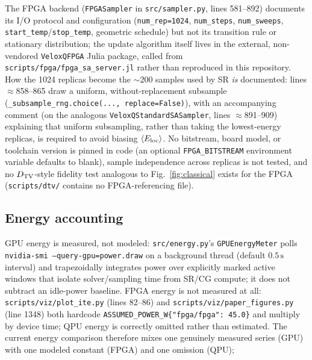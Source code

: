 The FPGA backend (\texttt{FPGASampler} in \texttt{src/sampler.py}, lines 581--892) documents its I/O protocol and configuration (\texttt{num\_rep=1024}, \texttt{num\_steps}, \texttt{num\_sweeps}, \texttt{start\_temp}/\texttt{stop\_temp}, geometric schedule) but not its transition rule or stationary distribution; the update algorithm itself lives in the external, non-vendored \texttt{VeloxQFPGA} Julia package, called from \texttt{scripts/fpga/fpga\_sa\_server.jl} rather than reproduced in this repository. How the 1024 replicas become the $\sim\!200$ samples used by SR \emph{is} documented: lines $\approx$858--865 draw a uniform, without-replacement subsample (\texttt{\_subsample\_rng.choice(..., replace=False)}), with an accompanying comment (on the analogous \texttt{VeloxQStandardSASampler}, lines $\approx$891--909) explaining that uniform subsampling, rather than taking the lowest-energy replicas, is required to avoid biasing $\left\langle E_{\mathrm{loc}}\right\rangle$. No bitstream, board model, or toolchain version is pinned in code (an optional \texttt{FPGA\_BITSTREAM} environment variable defaults to blank), sample independence across replicas is not tested, and no $D_{\mathrm{TV}}$-style fidelity test analogous to Fig.~\ref{fig:classical} exists for the FPGA (\texttt{scripts/dtv/} contains no FPGA-referencing file).


\subsection{Energy accounting}

GPU energy is measured, not modeled: \texttt{src/energy.py}'s \texttt{GPUEnergyMeter} polls \texttt{nvidia-smi --query-gpu=power.draw} on a background thread (default $0.5\,\mathrm s$ interval) and trapezoidally integrates power over explicitly marked active windows that isolate solver/sampling time from SR/CG compute; it does not subtract an idle-power baseline. FPGA energy is not measured at all: \texttt{scripts/viz/plot\_ite.py} (lines 82--86) and \texttt{scripts/viz/paper\_figures.py} (line 1348) both hardcode \texttt{ASSUMED\_POWER\_W\{"fpga/fpga": 45.0\}} and multiply by device time; QPU energy is correctly omitted rather than estimated. The current energy comparison therefore mixes one genuinely measured series (GPU) with one modeled constant (FPGA) and one omission (QPU); 
